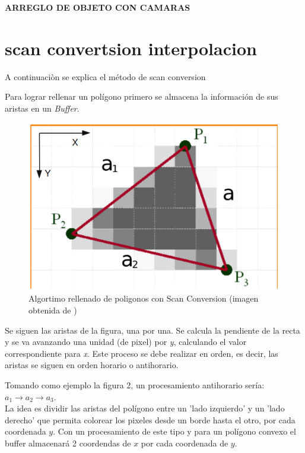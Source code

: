 \documentclass[12pt]{article}
\begin{document}
\textbf{ARREGLO DE OBJETO CON CAMARAS}

\section{scan convertsion interpolacion}

A continuaciòn se explica el método de scan conversion 


Para lograr rellenar un polígono primero se almacena la información de sus aristas en un \textit{Buffer}.


\begin{figure}[H]
\centering
\includegraphics[scale=0.5]{images/scanfillED.png}
\caption{Algortimo rellenado de poligonos con Scan Conversion (imagen obtenida de \cite{fill})}
\end{figure}

Se siguen las aristas de la figura, una por una. Se calcula la pendiente de la recta y se va avanzando una unidad (de pixel) por \textit{y}, calculando el valor correspondiente para \textit{x}. Este proceso se debe realizar en orden, es decir, las aristas se siguen en orden horario o antihorario. 

Tomando como ejemplo la figura 2, un procesamiento antihorario sería: $a_{1} \rightarrow a_{2} \rightarrow a_{3}$.\\

La idea es dividir las aristas del polígono entre un 'lado izquierdo' y un 'lado derecho' que permita colorear los pixeles desde un borde hasta el otro, por cada coordenada $y$. 
Con un procesamiento de este tipo y para un polígono convexo el buffer almacenará 2 coordendas de $x$ por cada coordenada de $y$.\\
\end{document}
